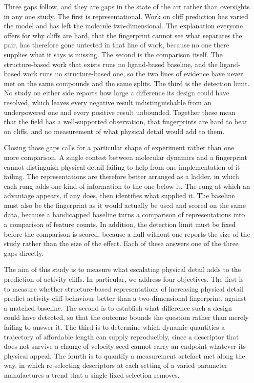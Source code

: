 Three gaps follow, and they are gaps in the state of the art rather than oversights in
any one study. The first is representational. Work on cliff prediction has varied the
model and has left the molecule two-dimensional. The explanation everyone offers for
why cliffs are hard, that the fingerprint cannot see what separates the pair, has
therefore gone untested in that line of work, because no one there supplies what it
says is missing. The second is the
comparison itself. The structure-based work that exists runs no ligand-based baseline,
and the ligand-based work runs no structure-based one, so the two lines of evidence
have never met on the same compounds and the same splits. The third is the detection
limit. No study on either side reports how large a difference its design could have
resolved, which leaves every negative result indistinguishable from an underpowered one
and every positive result unbounded. Together these mean that the field has a
well-supported observation, that fingerprints are hard to beat on cliffs, and no
measurement of what physical detail would add to them.

Closing those gaps calls for a particular shape of experiment rather than one more
comparison. A single contest between molecular dynamics and a fingerprint cannot
distinguish physical detail failing to help from one implementation of it failing. The
representations are therefore better arranged as a ladder, in which each rung adds one
kind of information to the one below it. The rung at which an advantage appears, if any
does, then identifies what supplied it. The baseline must also be the fingerprint as it
would actually be used and scored on the same data, because a handicapped baseline
turns a comparison of representations into a comparison of feature counts. In addition,
the detection limit must be fixed before the comparison is scored, because a null
without one reports the size of the study rather than the size of the effect. Each of
these answers one of the three gaps directly.

The aim of this study is to measure what escalating physical detail adds to the
prediction of activity cliffs. In particular, we address four objectives. The first is
to measure whether structure-based representations of increasing physical detail
predict activity-cliff behaviour better than a two-dimensional fingerprint, against a
matched baseline. The second is to establish what difference such a design could have
detected, so that the outcome bounds the question rather than merely failing to answer
it. The third is to determine which dynamic quantities a trajectory of affordable
length can supply reproducibly, since a descriptor that does not survive a change of
velocity seed cannot carry an endpoint whatever its physical appeal. The fourth is to
quantify a measurement artefact met along the way, in which re-selecting descriptors at
each setting of a varied parameter manufactures a trend that a single fixed selection
removes.

